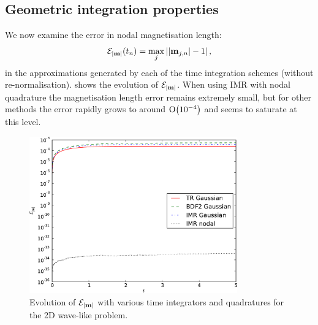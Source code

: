 \subsection{Geometric integration properties}
\label{sec:2d-wave-results-cons-prop}

We now examine the error in nodal magnetisation length:
\begin{equation}
  \mathcal{E}_{\left|{\boldsymbol{\mathrm{m}}} \right|}(t_n) = \max_j \left|{\left|{\boldsymbol{\mathrm{m}}_{j,n}} \right| - 1} \right|,
  \label{eq:102}
\end{equation}
in the approximations generated by each of the time integration schemes (without re-normalisation).
 shows the evolution of $\mathcal{E}_{\left|{\boldsymbol{\mathrm{m}}} \right|}$.
When using IMR with nodal quadrature the magnetisation length error remains extremely small, but for other methods the error rapidly grows to around $\mathrm{O}{\left( 10^{-4} \right)}$ and seems to saturate at this level.
\begin{figure}
  \centering
  \includegraphics[width=0.8\textwidth]
  {plots/2d_wave_solution_m_length/mlengtherrormaxesvstimes.pdf}
  \caption{Evolution of $\mathcal{E}_{\left|{\boldsymbol{\mathrm{m}}} \right|}$ with various time integrators and quadratures for the 2D wave-like problem.
  }
  \label{fig:mean-ml-error-2d}
\end{figure}

